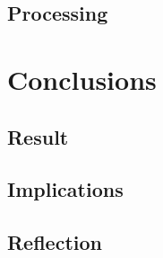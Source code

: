 \documentclass[a4paper,12pt]{article}
\begin{document}
\subsection{Processing}

\section{Conclusions}
\subsection{Result}
\subsection{Implications}
\subsection{Reflection}
\end{document}
